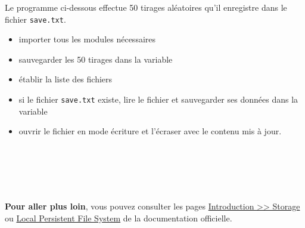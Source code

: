 \begin{methode}
    Le programme ci-dessous effectue 50 tirages aléatoires qu'il enregistre dans le fichier \texttt{save.txt}.
    
    \begin{itemize}
        \item importer tous les modules nécessaires
        \item sauvegarder les 50 tirages dans la variable 
        \item établir la liste des fichiers
        \item si le fichier \texttt{save.txt} existe, lire le fichier et sauvegarder ses données dans la variable 
        \item ouvrir le fichier en mode écriture et l'écraser avec le contenu mis à jour.
    \end{itemize}
    
    \\
    \\
    \\
    \\
\end{methode}

\begin{remarque}
\textbf{Pour aller plus loin}, vous pouvez consulter les pages  \href{https://microbit-micropython.readthedocs.io/fr/latest/tutorials/storage.html}{Introduction >> Storage} ou \href{https://microbit-micropython.readthedocs.io/fr/latest/filesystem.html}{Local Persistent File System} de la documentation officielle.
\end{remarque}